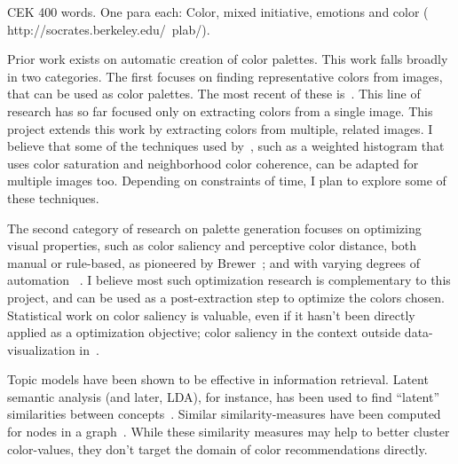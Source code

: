 CEK
400 words. 
One para each: Color, mixed initiative, emotions and color (  http://socrates.berkeley.edu/~plab/).

Prior work exists on automatic creation of color palettes. This work falls broadly in two categories. The first focuses on finding representative  colors from images, that can be used as color palettes. The most recent of these is~\cite{morse2007image}. This line of research has so far focused only on extracting colors from a single image. This project extends this work by extracting colors from multiple, related images. I believe that some of the techniques used by~\cite{morse2007image}, such as a weighted histogram that uses color saturation and neighborhood color coherence, can be adapted for multiple images too. Depending on constraints of time, I plan to explore some of these techniques.
	
The second category of research on palette generation focuses on optimizing visual properties, such as color saliency and perceptive color distance, both manual or rule-based, as pioneered by Brewer~\cite{brewer1999color}; and  with varying degrees of automation ~\cite{healey1996choosing, zeileis2009RGBland}. I believe most such optimization research is complementary to this project, and can be used as a post-extraction step to optimize the colors chosen. Statistical work on color saliency is valuable, even if it hasn't been directly applied as a optimization objective; color saliency in the context outside data-visualization in~\cite{chuang2008probabilistic, benavente2002statistical}. 

Topic models have been shown to be effective in information retrieval. Latent semantic analysis (and later, LDA), for instance, has been used to find ``latent'' similarities between concepts~\cite{dumais1988using, blei2003latent}. Similar similarity-measures have been computed for nodes in a graph~\cite{jeh2002simrank}. While these similarity measures may help to better cluster color-values, they don't target the domain of color recommendations directly. 
